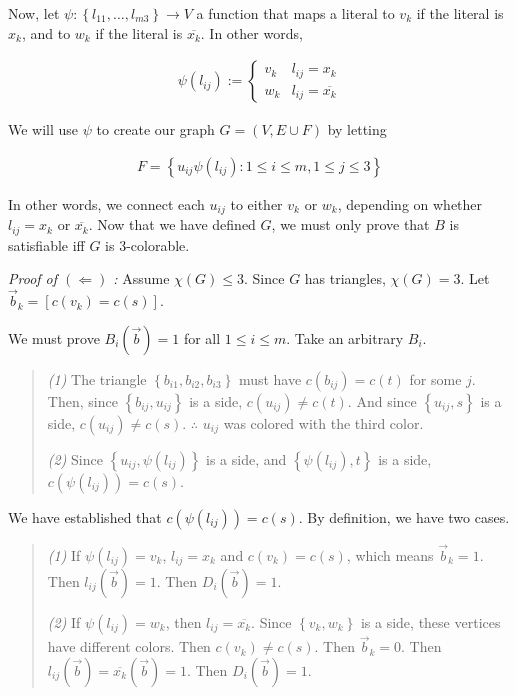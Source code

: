 \documentclass[a4paper, 12pt]{article}
\begin{document}
Now, let $\psi : \left\{ l_{11}, \ldots, l_{m3} \right\} \to V$ a function that maps a literal to $v_k$ if the literal is $x_k$, and to $w_k$ if the literal is $\overline{x_k}$. In other words, 

\begin{align*}
    \psi(l_{ij}) := \begin{cases}
        v_k & l_{ij} = x_k \\ 
        w_k & l_{ij} = \overline{x_k}
    \end{cases}
\end{align*}


We will use $\psi$ to create our graph $G = (V, E \cup F)$ by letting


\begin{align*}
    F = \left\{ u_{ij}\psi(l_{ij}) : 1 \leq i \leq m, 1 \leq j \leq 3 \right\} 
\end{align*}

In other words, we connect each $u_{ij}$ to either $v_k$ or $w_k$, depending 
on whether $l_{ij} = x_k$ or $\overline{x_k}$. Now that we have defined 
$G$, we must only prove that $B$ is satisfiable iff $G$ is $3$-colorable.

\textit{Proof of $(\Leftarrow)$ :} Assume $\chi(G) \leq 3$. Since $G$ has
triangles, $\chi(G) = 3$. Let $\overrightarrow{b}_k = \left[ c(v_k) = c(s)
\right] $.

We must prove $B_i(\overrightarrow{b}) = 1$ for all $1 \leq i \leq m$. Take an
arbitrary $B_i$. 


\begin{quote}

\textit{(1)} The triangle $\left\{ b_{i1}, b_{i 2}, b_{i 3} \right\} $
must have $c(b_{ij}) = c(t)$ for some $j$. Then, since $\left\{ b_{ij}, u_{ij}
\right\} $ is a side, $c(u_{ij}) \neq c(t)$. And since $\left\{ u_{ij}, s
\right\} $ is a side, $c(u_{ij}) \neq c(s)$. $\therefore $ $u_{ij}$ was
colored with the third color.

\textit{(2)} Since $\left\{ u_{ij}, \psi(l_{ij}) \right\} $ is a side, and
$\left\{ \psi(l_{ij}), t \right\} $ is a side, $c(\psi(l_{ij})) = c(s)$.

\end{quote}

We have established that $c(\psi(l_{ij})) = c(s)$. By definition, we have two
cases. 

\begin{quote}
    \textit{(1)} If $\psi(l_{ij}) = v_k$, $l_{ij} = x_k$ and $c(v_k) = c(s)$, which means $\overrightarrow{b}_k = 1$. Then $l_{ij}(\overrightarrow{b}) = 1$. Then $D_i(\overrightarrow{b}) = 1$.

    \textit{(2)} If $\psi(l_{ij}) = w_k$, then $l_{ij} = \overline{x_k}$. Since $\left\{ v_k, w_k \right\} $ is a side, these vertices have different colors. Then $c(v_k) \neq c(s)$. Then $\overrightarrow{b}_k = 0$. Then $l_{ij}(\overrightarrow{b}) = \overline{x_k}(\overrightarrow{b}) = 1$. Then $D_i(\overrightarrow{b}) = 1$.
\end{quote}
\end{document}
